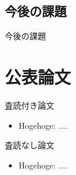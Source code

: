 \documentclass[12pt,epsf]{jreport}
\begin{document}
 \section{今後の課題}
 今後の課題


\chapter*{公表論文}

\begin{list}%
 {} %
 {} %
 \item 査読付き論文
       \begin{itemize}
	\item Hogehoge: ....
       \end{itemize}
 \item 査読なし論文
       \begin{itemize}
	\item Hogehoge: ....
       \end{itemize}
\end{list}

\newpage

%
\end{document}

